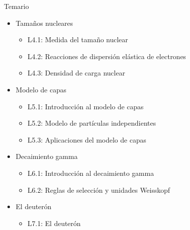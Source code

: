 \documentclass{beamer}
\begin{document}
\begin{frame}{Temario}
    \begin{itemize}
        \item Tamaños nucleares
\begin{itemize}
        \item L4.1: Medida del tamaño nuclear
        \item L4.2: Reacciones de dispersión elástica de electrones
        \item L4.3: Densidad de carga nuclear
\end{itemize}        
        \item Modelo de capas
\begin{itemize}
        \item L5.1: Introducción al modelo de capas
        \item L5.2: Modelo de partículas independientes
        \item L5.3: Aplicaciones del modelo de capas
\end{itemize} 
        \item Decaimiento gamma
\begin{itemize}
        \item L6.1: Introducción al decaimiento gamma   
        \item L6.2: Reglas de selección y unidades Weisskopf
\end{itemize} 
        \item El deuterón
\begin{itemize}
        \item L7.1: El deuterón
\end{itemize}      
    \end{itemize}
\end{frame}
\end{document}
